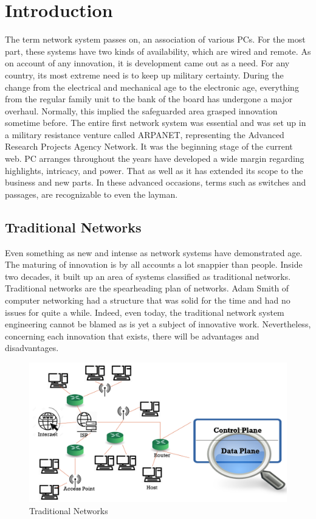 \chapter{Introduction}

The term network system passes on, an association of various PCs. For the most part, these systems have two kinds of availability, which are wired and remote. As on account of any innovation, it is development came out as a need. For any country, its most extreme need is to keep up military certainty. During the change from the electrical and mechanical age to the electronic age, everything from the regular family unit to the bank of the board has undergone a major overhaul. Normally, this implied the safeguarded area grasped innovation sometime before. The entire first network system was essential and was set up in a military resistance venture called ARPANET, representing the Advanced Research Projects Agency Network. It was the beginning stage of the current web. PC arranges throughout the years have developed a wide margin regarding highlights, intricacy, and power. That as well as it has extended its scope to the business and new parts. In these advanced occasions, terms such as switches and passages, are recognizable to even the layman.

\vspace{5mm}
\section{Traditional Networks}

Even something as new and intense as network systems have demonstrated age. The maturing of innovation is by all accounts a lot snappier than people. Inside two decades, it built up an area of systems classified as traditional networks. Traditional networks are the spearheading plan of networks. Adam Smith of computer networking had a structure that was solid for the time and had no issues for quite a while. Indeed, even today, the traditional network system engineering cannot be blamed as is yet a subject of innovative work. Nevertheless, concerning each innovation that exists, there will be advantages and disadvantages.

\begin{figure}[!hbt]
    \centering
    \includegraphics[width=\textwidth,keepaspectratio]{images/TRADITIONAL-NETWORK.png}
    \caption{Traditional Networks \cite{sdnimages}}
    \label{fig:Tradnets}
\end{figure}

